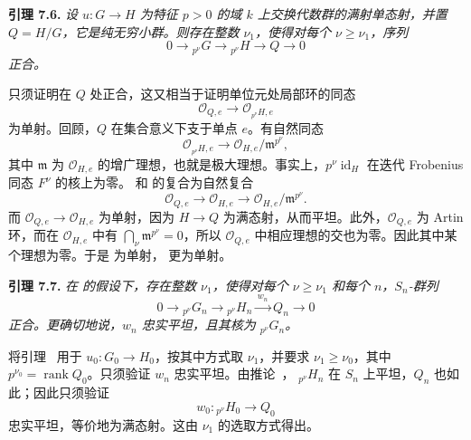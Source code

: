 \medskip
\noindent{}\textbf{引理 7.6.}
\textit{设 \(u:G\to H\) 为特征 \(p>0\) 的域 \(k\) 上交换代数群的满射单态射，并置 \(Q=H/G\)，它是纯无穷小群。则存在整数 \(\nu_1\)，使得对每个 \(\nu\geq\nu_1\)，序列}
\[
  0\longrightarrow{}_{p^\nu}G
  \longrightarrow{}_{p^\nu}H
  \longrightarrow Q\longrightarrow0
\]
\textit{正合。}

只须证明在 \(Q\) 处正合，这又相当于证明单位元处局部环的同态
\begin{equation}
  \tag{x}
  \mathscr O_{Q,e}\longrightarrow
  \mathscr O_{{}_{p^\nu}H,e}
\end{equation}
为单射。回顾，\(Q\) 在集合意义下支于单点 \(e\)。有自然同态
\begin{equation}
  \tag{xx}
  \mathscr O_{{}_{p^\nu}H,e}
  \longrightarrow
  \mathscr O_{H,e}/\mathfrak m^{p^\nu},
\end{equation}
其中 \(\mathfrak m\) 为 \(\mathscr O_{H,e}\) 的增广理想，也就是极大理想。事实上，\(p^\nu\operatorname{id}_H\) 在迭代 Frobenius 同态 \(F^\nu\) 的核上为零。 和  的复合为自然复合
\begin{equation}
  \tag{xxx}
  \mathscr O_{Q,e}\longrightarrow
  \mathscr O_{H,e}\longrightarrow
  \mathscr O_{H,e}/\mathfrak m^{p^\nu}.
\end{equation}
而 \(\mathscr O_{Q,e}\to\mathscr O_{H,e}\) 为单射，因为 \(H\to Q\) 为满态射，从而平坦。此外，\(\mathscr O_{Q,e}\) 为 Artin 环，而在 \(\mathscr O_{H,e}\) 中有 \(\bigcap_\nu\mathfrak m^{p^\nu}=0\)，所以 \(\mathscr O_{Q,e}\) 中相应理想的交也为零。因此其中某个理想为零。于是  为单射， 更为单射。

\medskip
\noindent{}\textbf{引理 7.7.}
\textit{在  的假设下，存在整数 \(\nu_1\)，使得对每个 \(\nu\geq\nu_1\) 和每个 \(n\)，\(S_n\)-群列}
\[
  0\longrightarrow{}_{p^\nu}G_n
  \longrightarrow{}_{p^\nu}H_n
  \xrightarrow{\,w_n\,}Q_n
  \longrightarrow0
\]
\textit{正合。更确切地说，\(w_n\) 忠实平坦，且其核为 \({}_{p^\nu}G_n\)。}

将引理~ 用于 \(u_0:G_0\to H_0\)，按其中方式取 \(\nu_1\)，并要求 \(\nu_1\geq\nu_0\)，其中 \(p^{\nu_0}=\operatorname{rank}Q_0\)。只须验证 \(w_n\) 忠实平坦。由推论~，
\({}_{p^\nu}H_n\) 在 \(S_n\) 上平坦，\(Q_n\) 也如此；因此只须验证
\[
  w_0:{}_{p^\nu}H_0\longrightarrow Q_0
\]
忠实平坦，等价地为满态射。这由 \(\nu_1\) 的选取方式得出。

